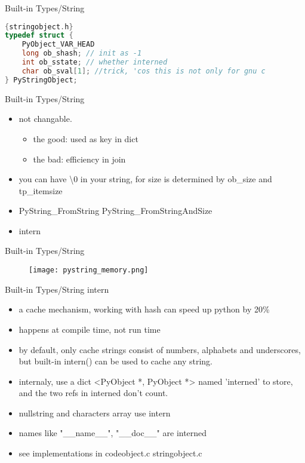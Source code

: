 \documentclass[xcolor=svgnames]{beamer}
\begin{document}
\begin{frame}[fragile]{Built-in Types/String}
\begin{lstlisting}[language=C]{stringobject.h}
typedef struct {
    PyObject_VAR_HEAD
    long ob_shash; // init as -1
    int ob_sstate; // whether interned
    char ob_sval[1]; //trick, 'cos this is not only for gnu c
} PyStringObject;
\end{lstlisting} 
\end{frame}


\begin{frame}{Built-in Types/String}
\begin{itemize} 
  \item not changable.
      \begin{itemize}
        \item the good: used as key in dict
        \item the bad: efficiency in join
      \end{itemize}
  \item you can have \textbackslash0 in your string, for size is determined by ob\_size and tp\_itemsize
  \item PyString\_FromString PyString\_FromStringAndSize
  \item intern
    \end{itemize} 
\end{frame}

\begin{frame}[fragile]{Built-in Types/String}
    \begin{figure}
       \begin{center}
       \texttt{[image: pystring\_memory.png]}
       \end{center}
\end{figure}
\end{frame}

\begin{frame}{Built-in Types/String}
intern
\begin{itemize} 
        \item a cache mechanism, working with hash can speed up python by 20\%
        \item happens at compile time, not run time
        \item by default, only cache strings consist of numbers, alphabets and underscores, but built-in intern() can be used to cache any string.
        \item internaly, use a dict <PyObject *, PyObject *> named 'interned' to store, and the two refs in interned don't count.
        \item nullstring and characters array use intern
        \item names like "\_\_name\_\_", "\_\_doc\_\_" are interned
        \item see implementations in codeobject.c stringobject.c
\end{itemize} 
\end{frame}
\end{document}
